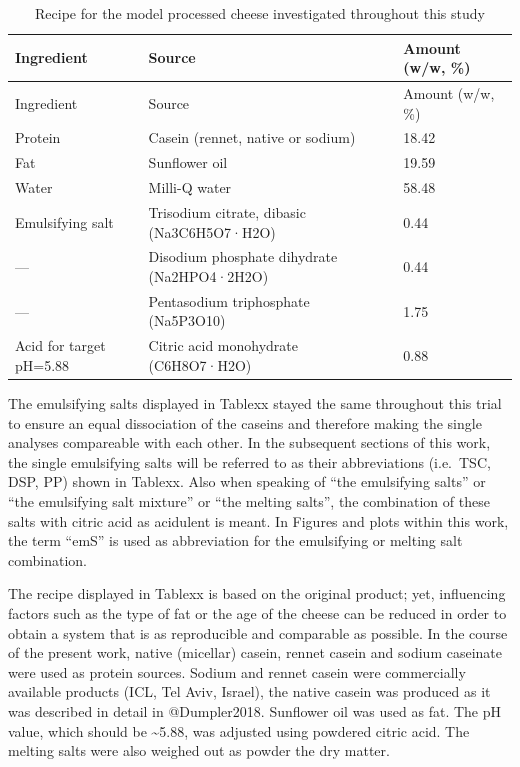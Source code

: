 \documentclass[
]{article}
\begin{document}
\begin{longtable}[]{@{}lll@{}}
\caption{Recipe for the model processed cheese investigated throughout
this study}\tabularnewline
\toprule
Ingredient & Source & Amount (w/w, \%) \\
\midrule
\endfirsthead
\toprule
Ingredient & Source & Amount (w/w, \%) \\
\midrule
\endhead
Protein & Casein (rennet, native or sodium) & 18.42 \\
Fat & Sunflower oil & 19.59 \\
Water & Milli-Q water & 58.48 \\
Emulsifying salt & Trisodium citrate, dibasic (Na3C6H5O7·H2O) & 0.44 \\
--- & Disodium phosphate dihydrate (Na2HPO4·2H2O) & 0.44 \\
--- & Pentasodium triphosphate (Na5P3O10) & 1.75 \\
Acid for target pH=5.88 & Citric acid monohydrate (C6H8O7·H2O) & 0.88 \\
\bottomrule
\end{longtable}

The emulsifying salts displayed in Tablexx stayed the same throughout
this trial to ensure an equal dissociation of the caseins and therefore
making the single analyses compareable with each other. In the
subsequent sections of this work, the single emulsifying salts will be
referred to as their abbreviations (i.e.~TSC, DSP, PP) shown in Tablexx.
Also when speaking of ``the emulsifying salts'' or ``the emulsifying
salt mixture'' or ``the melting salts'', the combination of these salts
with citric acid as acidulent is meant. In Figures and plots within this
work, the term ``emS'' is used as abbreviation for the emulsifying or
melting salt combination.

The recipe displayed in Tablexx is based on the original product; yet,
influencing factors such as the type of fat or the age of the cheese can
be reduced in order to obtain a system that is as reproducible and
comparable as possible. In the course of the present work, native
(micellar) casein, rennet casein and sodium caseinate were used as
protein sources. Sodium and rennet casein were commercially available
products (ICL, Tel Aviv, Israel), the native casein was produced as it
was described in detail in @Dumpler2018. Sunflower oil was used as fat.
The pH value, which should be \textasciitilde5.88, was adjusted using
powdered citric acid. The melting salts were also weighed out as powder
the dry matter.
\end{document}
